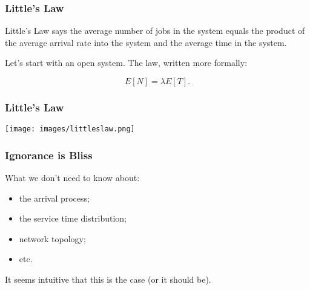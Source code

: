 \begin{frame}
\frametitle{Little's Law}

Little's Law says the average number of jobs in the system equals the product of the average arrival rate into the system and the average time in the system. 

Let's start with an open system. The law, written more formally:

\vspace*{-5em}
\[
	E[N] = \lambda E[T].
\]

\end{frame}



\begin{frame}
\frametitle{Little's Law}

\begin{center}
	\texttt{[image: images/littleslaw.png]}
\end{center}

\end{frame}



\begin{frame}
\frametitle{Ignorance is Bliss}

\large
\begin{changemargin}{1.5cm}
What we don't need to know about:
\begin{itemize}
\item the arrival process;
\item the service time distribution;
\item network topology;
\item etc. 
\end{itemize}

It seems intuitive that this is the case (or it should be). 
\end{changemargin}

\end{frame}



